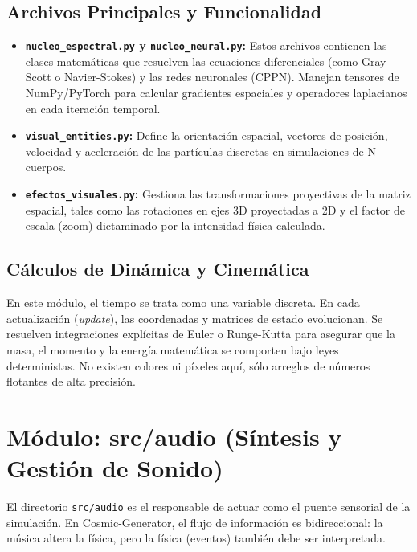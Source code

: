 \documentclass[12pt, openany]{book}
\begin{document}
\subsection{Archivos Principales y Funcionalidad}
\begin{itemize}
    \item \textbf{\texttt{nucleo\_espectral.py} y \textbf{\texttt{nucleo\_neural.py}}:} Estos archivos contienen las clases matemáticas que resuelven las ecuaciones diferenciales (como Gray-Scott o Navier-Stokes) y las redes neuronales (CPPN). Manejan tensores de NumPy/PyTorch para calcular gradientes espaciales y operadores laplacianos en cada iteración temporal.
    \item \textbf{\texttt{visual\_entities.py}:} Define la orientación espacial, vectores de posición, velocidad y aceleración de las partículas discretas en simulaciones de N-cuerpos. 
    \item \textbf{\texttt{efectos\_visuales.py}:} Gestiona las transformaciones proyectivas de la matriz espacial, tales como las rotaciones en ejes 3D proyectadas a 2D y el factor de escala (zoom) dictaminado por la intensidad física calculada.
\end{itemize}

\subsection{Cálculos de Dinámica y Cinemática}
En este módulo, el tiempo se trata como una variable discreta. En cada actualización (\textit{update}), las coordenadas y matrices de estado evolucionan. Se resuelven integraciones explícitas de Euler o Runge-Kutta para asegurar que la masa, el momento y la energía matemática se comporten bajo leyes deterministas. No existen colores ni píxeles aquí, sólo arreglos de números flotantes de alta precisión.

\section{Módulo: src/audio (Síntesis y Gestión de Sonido)}

El directorio \texttt{src/audio} es el responsable de actuar como el puente sensorial de la simulación. En Cosmic-Generator, el flujo de información es bidireccional: la música altera la física, pero la física (eventos) también debe ser interpretada.
\end{document}
